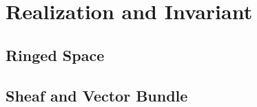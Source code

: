 \chapter{Realization and Invariant}\label{chap:realization} %

\section{Ringed Space}

\section{Sheaf and Vector Bundle}

